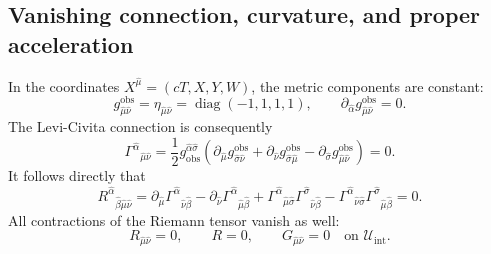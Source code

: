 \subsection{Vanishing connection, curvature, and proper acceleration}

In the coordinates \(X^{\hat\mu}=(cT,X,Y,W)\), the metric components are
constant:
\begin{equation}
  g_{\hat\mu\hat\nu}^{\mathrm{obs}}
  =
  \eta_{\hat\mu\hat\nu}
  =
  \operatorname{diag}(-1,1,1,1),
  \qquad
  \partial_{\hat\alpha}
  g_{\hat\mu\hat\nu}^{\mathrm{obs}}
  =
  0.
  \label{eq:observer-metric-constant}
\end{equation}
The Levi-Civita connection is consequently
\begin{equation}
  \Gamma^{\hat\alpha}{}_{\hat\mu\hat\nu}
  =
  \frac{1}{2}
  g_{\mathrm{obs}}^{\hat\alpha\hat\sigma}
  \left(
    \partial_{\hat\mu}
    g_{\hat\sigma\hat\nu}^{\mathrm{obs}}
    +
    \partial_{\hat\nu}
    g_{\hat\sigma\hat\mu}^{\mathrm{obs}}
    -
    \partial_{\hat\sigma}
    g_{\hat\mu\hat\nu}^{\mathrm{obs}}
  \right)
  =
  0.
  \label{eq:interior-christoffel-zero}
\end{equation}
It follows directly that
\begin{equation}
  R^{\hat\alpha}{}_{\hat\beta\hat\mu\hat\nu}
  =
  \partial_{\hat\mu}
  \Gamma^{\hat\alpha}{}_{\hat\nu\hat\beta}
  -
  \partial_{\hat\nu}
  \Gamma^{\hat\alpha}{}_{\hat\mu\hat\beta}
  +
  \Gamma^{\hat\alpha}{}_{\hat\mu\hat\sigma}
  \Gamma^{\hat\sigma}{}_{\hat\nu\hat\beta}
  -
  \Gamma^{\hat\alpha}{}_{\hat\nu\hat\sigma}
  \Gamma^{\hat\sigma}{}_{\hat\mu\hat\beta}
  =
  0.
  \label{eq:interior-riemann-zero}
\end{equation}
All contractions of the Riemann tensor vanish as well:
\begin{equation}
  R_{\hat\mu\hat\nu}
  =
  0,
  \qquad
  R
  =
  0,
  \qquad
  G_{\hat\mu\hat\nu}
  =
  0
  \quad
  \text{on }
  \mathcal U_{\mathrm{int}}.
  \label{eq:interior-curvature-contractions}
\end{equation}

